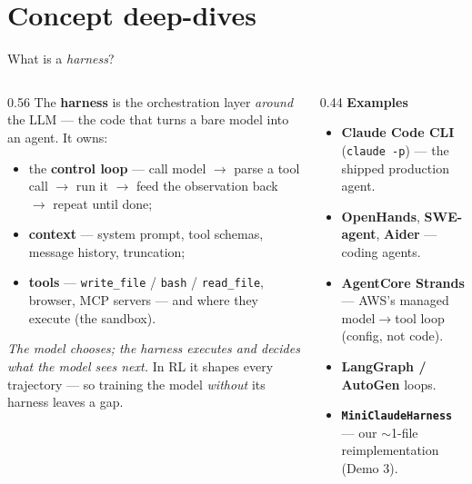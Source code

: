 \documentclass[aspectratio=169]{beamer}
\begin{document}
\section{Concept deep-dives}

\begin{frame}{What is a \emph{harness}?}
  \begin{columns}[T]
    \begin{column}{0.56\textwidth}
      \footnotesize The \textbf{harness} is the orchestration layer \emph{around} the LLM --- the
      code that turns a bare model into an agent. It owns:
      \begin{itemize}\setlength\itemsep{0.2em}
        \item the \textbf{control loop} --- call model $\to$ parse a tool call $\to$ run it $\to$
          feed the observation back $\to$ repeat until done;
        \item \textbf{context} --- system prompt, tool schemas, message history, truncation;
        \item \textbf{tools} --- \texttt{write\_file} / \texttt{bash} / \texttt{read\_file}, browser,
          MCP servers --- and where they execute (the sandbox).
      \end{itemize}
      \vspace{0.3em}
      \emph{The model chooses; the harness executes and decides what the model sees next.} In RL it
      shapes every trajectory --- so training the model \emph{without} its harness leaves a gap.
    \end{column}
    \begin{column}{0.44\textwidth}
      \textbf{Examples}
      \begin{itemize}\setlength\itemsep{0.15em}
        \footnotesize
        \item \textbf{Claude Code CLI} (\texttt{claude -p}) --- the shipped production agent.
        \item \textbf{OpenHands}, \textbf{SWE-agent}, \textbf{Aider} --- coding agents.
        \item \textbf{AgentCore Strands} --- AWS's managed model$\to$tool loop (config, not code).
        \item \textbf{LangGraph / AutoGen} loops.
        \item \textbf{\texttt{MiniClaudeHarness}} --- our $\sim$1-file reimplementation (Demo 3).
      \end{itemize}

\end{column}
\end{columns}
\end{frame}
\end{document}
